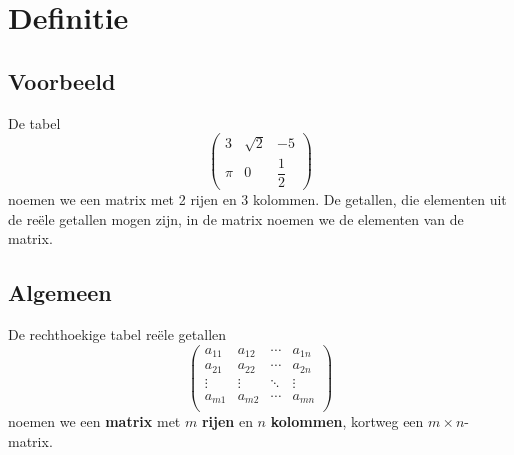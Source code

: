 \documentclass[12pt,twoside]{article}
\begin{document}
\thispagestyle{empty}
\clearpage

\tableofcontents
\thispagestyle{empty}
\clearpage


\pagestyle{fancy}
\fancyhead[RE,LO]{}

\section{Definitie}

\subsection{Voorbeeld}

De tabel
$$\begin{pmatrix}3 & \sqrt{2} & -5\\ \pi & 0 & \dfrac{1}{2}\end{pmatrix}$$
noemen we een matrix met 2 rijen en 3 kolommen. De getallen, die elementen uit de reële getallen mogen zijn, in de matrix noemen we de elementen van de matrix.

\subsection{Algemeen}

De rechthoekige tabel reële getallen
$$
\begin{pmatrix}
  a_{11} & a_{12} & \cdots & a_{1n} \\
  a_{21} & a_{22} & \cdots & a_{2n} \\
  \vdots      & \vdots      & \ddots & \vdots      \\
  a_{m1} & a_{m2} & \cdots & a_{mn} \\
\end{pmatrix}
$$
noemen we een {\bf matrix} met $m$ {\bf rijen} en $n$ {\bf kolommen}, kortweg een $m \times n$-matrix.
\end{document}
